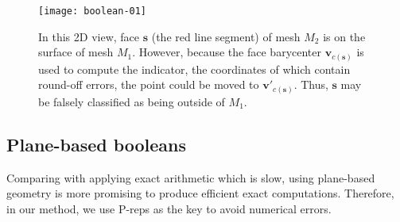 \begin{figure}[t]
\centering
\texttt{[image: boolean-01]}
\caption{In this 2D view, face $\bm{s}$ (the red line segment) of mesh $M_2$ is on the surface of mesh $M_1$. However, because the face barycenter $\bm{v}_{c(\bm{s})}$ is used to compute the indicator, the coordinates of which contain round-off errors, the point could be moved to $\bm{v'}_{c(\bm{s})}$. Thus, $\bm{s}$ may be falsely classified as being outside of $M_1$.}
\label{fig:falseclass}
\end{figure}




\subsection{Plane-based booleans}
Comparing with applying exact arithmetic which is slow, using plane-based geometry \cite{campen2010exact} is more promising to produce efficient exact computations. Therefore, in our method, we use P-reps as the key to avoid numerical errors.

